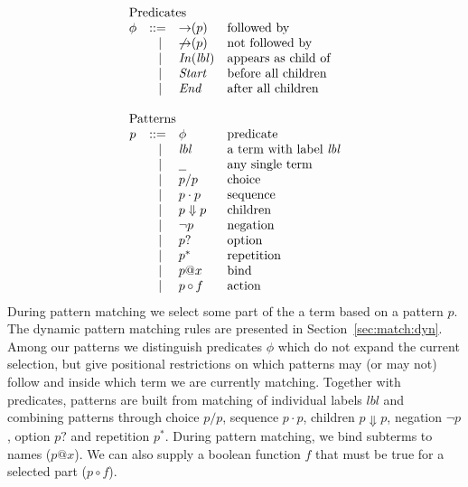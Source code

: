 \documentclass{article}
\makeatletter
\newcommand{\lbl}{\ensuremath{\mathit{lbl}}}
\newcommand{\pseq}[2]{\ensuremath{#1 \cdot #2}}
\newcommand{\por}[2]{\ensuremath{#1/#2}}
\newcommand{\children}[2]{\ensuremath{#1} \Downarrow #2}
\newcommand{\pnot}[1]{\ensuremath{\lnot #1}}
\newcommand{\maybe}[1]{\ensuremath{#1?}}
\newcommand{\many}[1]{\ensuremath{#1^*}}
\newcommand{\any}{\ensuremath{\text{\underline{\hspace{0.6em}}}}}
\newcommand{\bind}[2]{\ensuremath{#1@#2}}
\newcommand{\paction}[2]{\ensuremath{#1\mathop{\circ} #2}}
\newcommand{\fb}[1]{\ensuremath{\mathop{\rightarrow}(#1)}}
\newcommand{\nfb}[1]{\ensuremath{\mathop{\not\rightarrow}(#1)}}
\newcommand{\pin}[1]{\ensuremath{\mathit{In}(#1)}}
\newcommand{\pstart}{\ensuremath{\mathit{Start}}}
\newcommand{\pend}{\ensuremath{\mathit{End}}}
\newcommand{\arrayheading}[2]{\multicolumn{#1}{l}{\mbox{#2}}}
\makeatother
\begin{document}
\[
  \begin{array}{crll}
    \arrayheading{4}{Predicates}\\
      \phi & ::= & \fb{p}      & \text{followed by}         \\
           & ~|~ & \nfb{p}     & \text{not followed by}     \\
           & ~|~ & \pin{\lbl}  & \text{appears as child of} \\
           & ~|~ & \pstart{}   & \text{before all children} \\
           & ~|~ & \pend{}     & \text{after all children}  \\
    \\
    \arrayheading{4}{Patterns}\\
      p & ::= & \phi            & \text{predicate}                          \\
        & ~|~ & \lbl            & \text{a term with label $\lbl$}           \\
        & ~|~ & \any{}          & \text{any single term}                    \\
        & ~|~ & \por{p}{p}      & \text{choice}                             \\
        & ~|~ & \pseq{p}{p}     & \text{sequence}                           \\
        & ~|~ & \children{p}{p} & \text{children}                           \\
        & ~|~ & \pnot{p}        & \text{negation}                           \\
        & ~|~ & \maybe{p}       & \text{option}                             \\
        & ~|~ & \many{p}        & \text{repetition}                         \\
        & ~|~ & \bind{p}{x}     & \text{bind}                               \\
        & ~|~ & \paction{p}{f}  & \text{action}                             \\
  \end{array}
\]
%
During pattern matching we select some part of the a term based on
a pattern $p$. The dynamic pattern matching rules are presented in
Section~\ref{sec:match:dyn}. Among our patterns we distinguish
predicates $\phi$ which do not expand the current selection, but
give positional restrictions on which patterns may (or may not)
follow and inside which term we are currently matching.
%
Together with predicates, patterns are built from matching of
individual labels $\lbl$ and combining patterns through choice
$\por{p}{p}$, sequence $\pseq{p}{p}$, children $\children{p}{p}$,
negation $\pnot{p}$, option $\maybe{p}$ and repetition $\many{p}$.
%
During pattern matching, we bind subterms to names ($\bind{p}{x}$).
We can also supply a boolean function $f$ that must be true for
a selected part ($\paction{p}{f}$).
\end{document}
